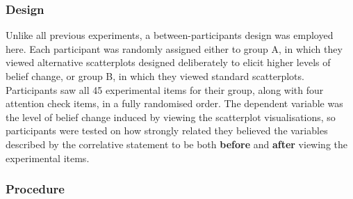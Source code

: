 \documentclass[../main.tex]{subfiles}
\begin{document}
\subsubsection{Design}\label{design-e5}

Unlike all previous experiments, a between-participants design was
employed here. Each participant was randomly assigned either to group A,
in which they viewed alternative scatterplots designed deliberately to
elicit higher levels of belief change, or group B, in which they viewed
standard scatterplots. Participants saw all 45 experimental items for
their group, along with four attention check items, in a fully
randomised order. The dependent variable was the level of belief change
induced by viewing the scatterplot visualisations, so participants were
tested on how strongly related they believed the variables described by
the correlative statement to be both \textbf{before} and \textbf{after}
viewing the experimental items.

\subsubsection{Procedure}\label{procedure-e5}
\end{document}
